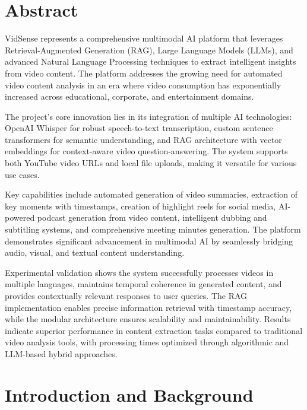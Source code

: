 \documentclass{bscs}
\begin{document}
\tableofcontents
\listoffigures
\listoftables
{}

\mainmatter

\chapter*{Abstract}

VidSense represents a comprehensive multimodal AI platform that leverages Retrieval-Augmented Generation (RAG), Large Language Models (LLMs), and advanced Natural Language Processing techniques to extract intelligent insights from video content. The platform addresses the growing need for automated video content analysis in an era where video consumption has exponentially increased across educational, corporate, and entertainment domains.

The project's core innovation lies in its integration of multiple AI technologies: OpenAI Whisper for robust speech-to-text transcription, custom sentence transformers for semantic understanding, and RAG architecture with vector embeddings for context-aware video question-answering. The system supports both YouTube video URLs and local file uploads, making it versatile for various use cases.

Key capabilities include automated generation of video summaries, extraction of key moments with timestamps, creation of highlight reels for social media, AI-powered podcast generation from video content, intelligent dubbing and subtitling systems, and comprehensive meeting minutes generation. The platform demonstrates significant advancement in multimodal AI by seamlessly bridging audio, visual, and textual content understanding.

Experimental validation shows the system successfully processes videos in multiple languages, maintains temporal coherence in generated content, and provides contextually relevant responses to user queries. The RAG implementation enables precise information retrieval with timestamp accuracy, while the modular architecture ensures scalability and maintainability. Results indicate superior performance in content extraction tasks compared to traditional video analysis tools, with processing times optimized through algorithmic and LLM-based hybrid approaches.

\chapter{Introduction and Background}
\end{document}
